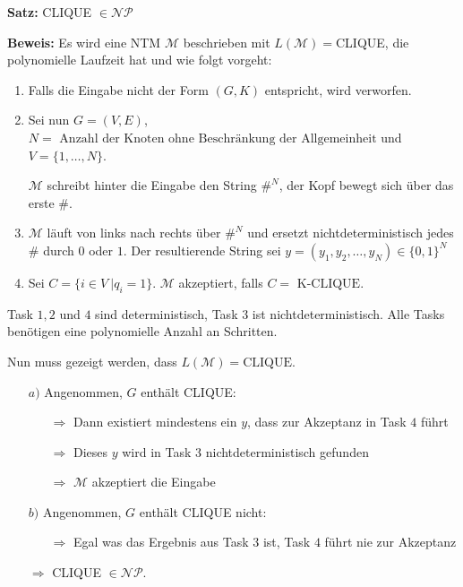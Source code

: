 \documentclass{scrartcl}%
\begin{document}
    \newpage
    \vspace*{0.3cm}
    \textbf{\textsf{Satz:}}
    CLIQUE $\in \mathcal{N}\mathcal{P}$

    \vspace*{0.3cm}
    \textbf{\textsf{Beweis:}} Es wird eine NTM $\mathcal{M}$ beschrieben mit $L(\mathcal{M}) =$CLIQUE,
    die polynomielle Laufzeit hat und wie folgt vorgeht:
    \begin{enumerate}
        \item Falls die Eingabe nicht der Form $(G,K)$ entspricht, wird verworfen.
        \item Sei nun $G=(V, E)$, $N=\text{ Anzahl der Knoten ohne Beschränkung der Allgemeinheit}$ und $V=\{1, \dots, N\}$.

        $\mathcal{M}$ schreibt hinter die Eingabe den String  $\#^N$, der Kopf bewegt sich über das erste $\#$.
        \item $\mathcal{M}$ läuft von links nach rechts über $\#^N$ und ersetzt nichtdeterministisch jedes $\#$ durch $0$ oder $1$.
        Der resultierende String sei $y = (y_1, y_2, \dots, y_N) \in \{0,1\}^N$
        \item Sei $C = \{ i \in V\ |q_i = 1\}$. $\mathcal{M}$ akzeptiert, falls $C = \text{ K-CLIQUE}$.
    \end{enumerate}

    Task $1,2$ und $4$ sind deterministisch, Task $3$ ist nichtdeterministisch.
    Alle Tasks benötigen eine polynomielle Anzahl an Schritten.

    \vspace*{0.3cm}
    Nun muss gezeigt werden, dass $L(\mathcal{M}) = \text{CLIQUE}$.

    \begin{itemize}
        \item [$a)$] Angenommen, $G$ enthält CLIQUE:
        \begin{itemize}
            \item [$\Rightarrow$] Dann existiert mindestens ein $y$, dass zur Akzeptanz in Task $4$ führt
            \item [$\Rightarrow$] Dieses $y$ wird in Task $3$ nichtdeterministisch gefunden
            \item [$\Rightarrow$] $\mathcal{M}$ akzeptiert die Eingabe
        \end{itemize}
        \item [$b)$] Angenommen, $G$ enthält CLIQUE nicht:
        \begin{itemize}
            \item [$\Rightarrow$] Egal was das Ergebnis aus Task $3$ ist, Task $4$ führt nie zur Akzeptanz
        \end{itemize}
        \item [$\Rightarrow$] CLIQUE $\in \mathcal{N}\mathcal{P}$.\proofend
    \end{itemize}
\end{document}
